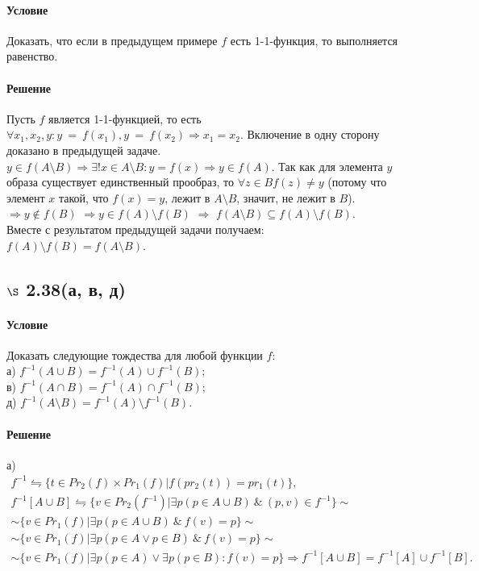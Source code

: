 \documentclass[a4paper,12pt]{article}
\begin{document}
\paragraph*{Условие}
Доказать, что если в предыдущем примере $f$ есть 1-1-функция, то выполняется равенство.
\paragraph*{Решение}
Пусть $f$ является 1-1-функцией, то есть $\forall x_1,x_2,y: y~=~f(x_1), y~=~f(x_2) \Rightarrow x_1=x_2$. Включение в одну сторону доказано в предыдущей задаче. \\
$y\in f(A\setminus B) \Rightarrow \exists ! x\in A\setminus B: y=f(x) \Rightarrow y\in f(A)$. Так как для  элемента $y$ образа существует единственный прообраз, то $\forall z\in B f(z)\ne y$ (потому что элемент $x$ такой, что $f(x)=y$, лежит в $A\setminus B$, значит, не лежит в $B$). $\Rightarrow y\notin f(B)$ $\Rightarrow y\in f(A)\setminus f(B)$ $\Rightarrow$ $f(A\setminus B) \subseteq f(A)\setminus f(B)$.\\
Вместе с результатом предыдущей задачи получаем:\\
 $f(A)\setminus f(B) = f(A\setminus B)$.
 
\subsection*{$\S$ 2.38(а, в, д)}
\paragraph*{Условие}
Доказать следующие тождества для любой функции $f$:\\
а) $f^{-1} (A\cup B) = f^{-1} (A) \cup f^{-1} (B)$; \\
в) $f^{-1} (A\cap B) = f^{-1} (A) \cap f^{-1} (B)$; \\
д) $f^{-1} (A\setminus B) = f^{-1} (A)\setminus f^{-1}(B)$.
\paragraph*{Решение}
а)
\begin{gather*}
f^{-1} \leftrightharpoons \{t\in Pr_2(f)\times Pr_1(f)|f(pr_2(t)) = pr_1(t) \}, \\
f^{-1}[A\cup B] \leftrightharpoons \{v\in Pr_2(f^{-1})|\exists p(p\in A\cup B) \ \& \ (p,v) \in f^{-1}\} \sim \\
\sim \{v\in Pr_1(f)|\exists p(p\in A\cup B) \ \& \ f(v) = p\} \sim \\
\sim \{v\in Pr_1(f)|\exists p(p\in A \vee p\in B) \ \& \ f(v)=p \}\sim \\
\sim \{v\in Pr_1(f)|\exists p(p\in A) \vee \exists p(p\in B): f(v)=p\} \Rightarrow f^{-1}[A\cup B] = f^{-1}[A] \cup f^{-1}[B].
\end{gather*}
\end{document}
